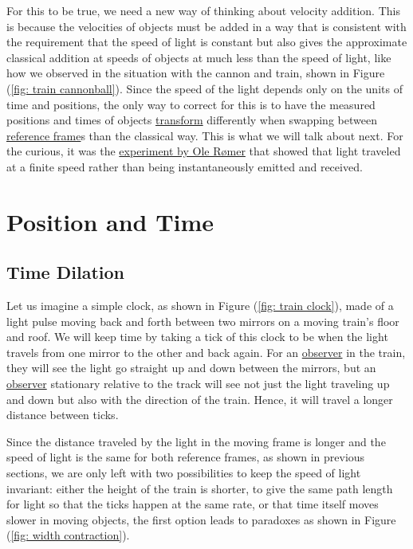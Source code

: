 For this to be true, we need a new way of thinking about velocity addition.
This is because the velocities of objects must be added in a way that is consistent with the requirement that the speed of light is constant but also gives the approximate classical addition at speeds of objects at much less than the speed of light, like how we observed in the situation with the cannon and train, shown in Figure (\ref{fig: train cannonball}).
Since the speed of the light depends only on the units of time and positions, the only way to correct for this is to have the measured positions and times of objects \hyperlink{def-transform}{transform} differently when swapping between \hyperlink{def-Reference-frame}{reference frame}s than the classical way.
This is what we will talk about next.
For the curious, it was the \href{https://scienceready.com.au/pages/determination-of-speed-of-light}{experiment by Ole Rømer} that showed that light traveled at a finite speed rather than being instantaneously emitted and received.

\section{Position and Time}

\subsection{Time Dilation}\label{Subsect: Time Dilation}

Let us imagine a simple clock, as shown in Figure (\ref{fig: train clock}), made of a light pulse moving back and forth between two mirrors on a moving train's floor and roof.
We will keep time by taking a tick of this clock to be when the light travels from one mirror to the other and back again.
For an \hyperlink{def-observer}{observer} in the train, they will see the light go straight up and down between the mirrors, but an \hyperlink{def-observer}{observer} stationary relative to the track will see not just the light traveling up and down but also with the direction of the train.
Hence, it will travel a longer distance between ticks.

Since the distance traveled by the light in the moving frame is longer and the speed of light is the same for both reference frames, as shown in previous sections, we are only left with two possibilities to keep the speed of light invariant: either the height of the train is shorter, to give the same path length for light so that the ticks happen at the same rate, or that time itself moves slower in moving objects, the first option leads to paradoxes as shown in Figure (\ref{fig: width contraction}).

